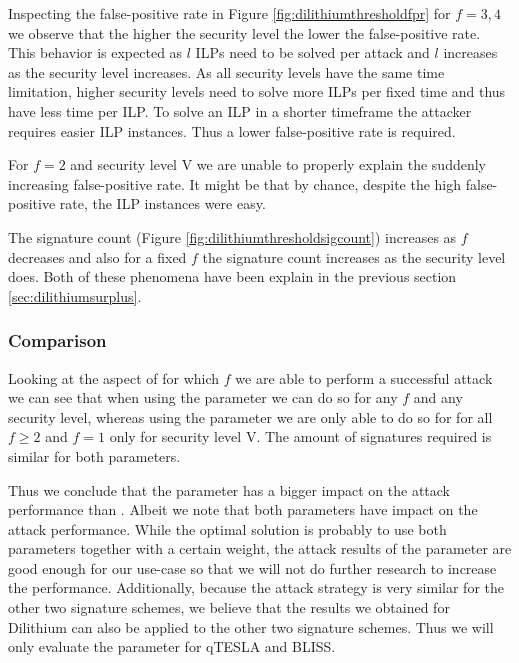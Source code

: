 Inspecting the false-positive rate in Figure \ref{fig:dilithiumthresholdfpr} for $f=3, 4$ we observe that the higher the security level the lower the false-positive rate. This behavior is expected as $l$ ILPs need to be solved per attack and $l$ increases as the security level increases. As all security levels have the same time limitation, higher security levels need to solve more ILPs per fixed time and thus have less time per ILP. To solve an ILP in a shorter timeframe the attacker requires easier ILP instances. Thus a lower false-positive rate is required. %

For $f = 2$ and security level V we are unable to properly explain the suddenly increasing false-positive rate. It might be that by chance, despite the high false-positive rate, the ILP instances were easy.

The signature count (Figure \ref{fig:dilithiumthresholdsigcount}) increases as $f$ decreases and also for a fixed $f$ the signature count increases as the security level does.
Both of these phenomena have been explain in the previous section \ref{sec:dilithiumsurplus}.

\subsubsection{Comparison}
\label{sec:dilithiumcompare}
Looking at the aspect of for which $f$ we are able to perform a successful attack we can see that when using the  parameter we can do so for any $f$ and any security level, whereas using the  parameter we are only able to do so for for all $f \geq 2$ and $f = 1$ only for security level V. 
The amount of signatures required is similar for both parameters.

Thus we conclude that the parameter  has a bigger impact on the attack performance than .
Albeit we note that both parameters have impact on the attack performance. While the optimal solution is probably to use both parameters together with a certain weight, the attack results of the  parameter are good enough for our use-case so that we will not do further research to increase the performance.
Additionally, because the attack strategy is very similar for the other two signature schemes, we believe that the results we obtained for Dilithium can also be applied to the other two signature schemes. Thus we will only evaluate the  parameter for qTESLA and BLISS.

